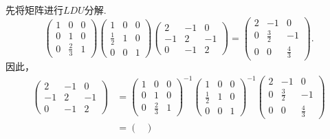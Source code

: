 ﻿\documentclass{book} \usepackage{exsheets} \usepackage{xeCJK}
\begin{document}
\begin{solution}
  先将矩阵进行$LDU$分解.
$$
\begin{pmatrix}
  1&0&0\\
  0&1&0\\
  0& \frac{2}{3}&1
\end{pmatrix}
\begin{pmatrix}
  1&0&0\\
  \frac{1}{2}&1&0\\
  0&0&1
\end{pmatrix}
\begin{pmatrix}
  2&-1&0\\
  -1&2&-1\\
  0&-1&2
\end{pmatrix}=
\begin{pmatrix}
  2&-1&0\\
  0&\frac{3}{2}&-1\\
  0&0&\frac{4}{3}
\end{pmatrix}.
$$
因此，
\begin{align*}
  \begin{pmatrix}
    2&-1&0\\
    -1&2&-1\\
    0&-1&2
  \end{pmatrix}&=
                 \begin{pmatrix}
                   1&0&0\\
                   0&1&0\\
                   0&\frac{2}{3}&1
                 \end{pmatrix}^{-1}
                                  \begin{pmatrix}
                                    1&0&0\\
                                    \frac{1}{2}&1&0\\
                                    0&0&1
                                  \end{pmatrix}^{-1}
                                         \begin{pmatrix}
                                           2&-1&0\\
                                           0& \frac{3}{2}&-1\\
                                           0&0&\frac{4}{3}
                                         \end{pmatrix}\\&=
                                                          \begin{pmatrix}

\end{pmatrix}
\end{align*}
\end{solution}
\end{document}
